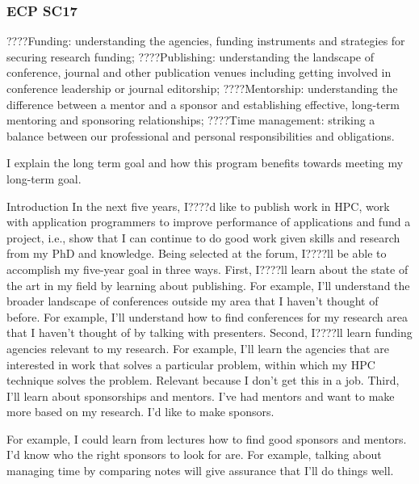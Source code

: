 \begin{frame} 

\frametitle{ECP SC17} 

????Funding: understanding the agencies, funding instruments and
strategies for securing research funding;
????Publishing: understanding the landscape of conference, journal and
other publication venues including getting involved in conference
leadership or journal editorship;
????Mentorship: understanding the difference between a mentor and a
sponsor and establishing effective, long-term mentoring and sponsoring
relationships;
????Time management: striking a balance between our professional and
personal responsibilities and obligations.



I explain the long term goal and how this program benefits towards
meeting my long-term goal. 

\begin{outline}[enumerate]
  \tiny \1 {\tiny  Introduction} 
    \tiny \2 {\tiny In the next five years, I????d like to publish work in
      HPC, work with application programmers to improve performance of
      applications and fund a project, i.e., show that I can continue to
      do good work given skills and research from my PhD and knowledge.}  
    \tiny \2 {\tiny Being selected at the forum, I????ll be able to
      accomplish my five-year goal in three ways. } 
    \tiny \1 {\tiny First, I????ll learn about the state of the art in
      my field by learning about publishing. }
    \tiny \2 {\tiny For example, I'll understand the broader landscape
    of conferences outside my area that I haven't thought of before.} 
    \tiny \2 {\tiny For example, I'll understand how to find
      conferences for my research area that I haven't thought of by
      talking with presenters.} 
    \tiny \1 {\tiny Second, I????ll learn funding agencies relevant to my
      research.}
    \tiny \2 {\tiny For example, I'll learn the agencies that are
      interested in work that solves a particular problem, within
      which my HPC technique solves the problem.} 
    \tiny \2 {\tiny Relevant because I don't get this in a job.}
    \tiny \1 {\tiny Third, I'll learn about sponsorships and
      mentors.} 
    \tiny \2 {\tiny I've had mentors and want to make more based on my
    research.}
    \tiny \2 {\tiny I'd like to make sponsors.}
    
    \tiny \2 {\tiny For example, I could learn from lectures how to 
      find good sponsors and mentors.}
    \tiny \2 {\tiny I'd know who the right sponsors to look for are.}
    \tiny \2 {\tiny For example, talking about managing time by
      comparing notes will give assurance that I'll do things well.}
\end{outline}


\end{frame} 



